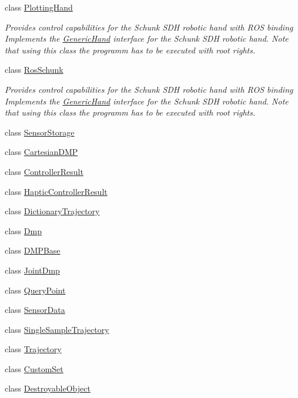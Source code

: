 \begin{DoxyCompactItemize}
class \hyperlink{classkukadu_1_1PlottingHand}{Plotting\-Hand}
\begin{DoxyCompactList}\small\item\em Provides control capabilities for the Schunk S\-D\-H robotic hand with R\-O\-S binding Implements the \hyperlink{classkukadu_1_1GenericHand}{Generic\-Hand} interface for the Schunk S\-D\-H robotic hand. Note that using this class the programm has to be executed with root rights. \end{DoxyCompactList}\item 
class \hyperlink{classkukadu_1_1RosSchunk}{Ros\-Schunk}
\begin{DoxyCompactList}\small\item\em Provides control capabilities for the Schunk S\-D\-H robotic hand with R\-O\-S binding Implements the \hyperlink{classkukadu_1_1GenericHand}{Generic\-Hand} interface for the Schunk S\-D\-H robotic hand. Note that using this class the programm has to be executed with root rights. \end{DoxyCompactList}\item 
class \hyperlink{classkukadu_1_1SensorStorage}{Sensor\-Storage}
\item 
class \hyperlink{classkukadu_1_1CartesianDMP}{Cartesian\-D\-M\-P}
\item 
class \hyperlink{classkukadu_1_1ControllerResult}{Controller\-Result}
\item 
class \hyperlink{classkukadu_1_1HapticControllerResult}{Haptic\-Controller\-Result}
\item 
class \hyperlink{classkukadu_1_1DictionaryTrajectory}{Dictionary\-Trajectory}
\item 
class \hyperlink{classkukadu_1_1Dmp}{Dmp}
\item 
class \hyperlink{classkukadu_1_1DMPBase}{D\-M\-P\-Base}
\item 
class \hyperlink{classkukadu_1_1JointDmp}{Joint\-Dmp}
\item 
class \hyperlink{classkukadu_1_1QueryPoint}{Query\-Point}
\item 
class \hyperlink{classkukadu_1_1SensorData}{Sensor\-Data}
\item 
class \hyperlink{classkukadu_1_1SingleSampleTrajectory}{Single\-Sample\-Trajectory}
\item 
class \hyperlink{classkukadu_1_1Trajectory}{Trajectory}
\item 
class \hyperlink{classkukadu_1_1CustomSet}{Custom\-Set}
\item 
class \hyperlink{classkukadu_1_1DestroyableObject}{Destroyable\-Object}

\end{DoxyCompactItemize}
